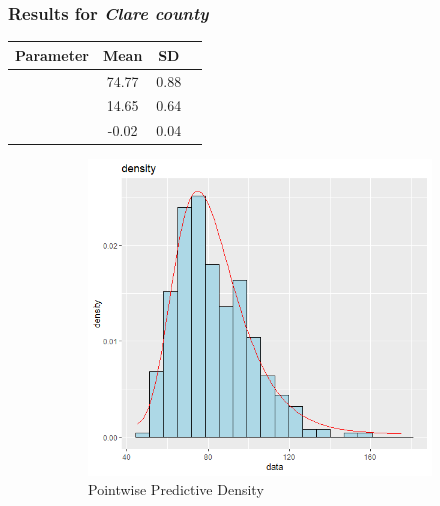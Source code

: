 \documentclass[usenames,dvipsnames]{beamer}
\begin{document}
\begin{frame}
\frametitle{Results for \textit{Clare county }}

\begin{center}
\begin{tabular}{ |c|c|c|c| } 
\hline
\textbf{Parameter}&\textbf{Mean}&\textbf{SD}\\ 
\hline

			\mu &74.77&0.88\\
\hline
			\sigma &14.65&0.64\\
\hline
			\xi &-0.02& 0.04\\
\hline
\end{tabular}
\end{center}


\begin{figure}
  \centering
  \begin{subfigure}[b]{0.4\textwidth}
    \includegraphics[width=\textwidth]{clare30density.png}
    \caption{Pointwise Predictive Density}
    \label{fig:sub1}
  \end{subfigure}
  \hfill
  \begin{subfigure}[b]{0.4\textwidth}

\end{subfigure}
\end{figure}
\end{frame}
\end{document}
